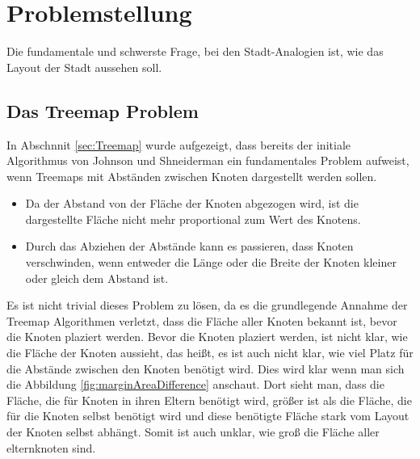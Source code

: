 \section{Problemstellung} \label{sec:Problemstellung}
Die fundamentale und schwerste Frage, bei den Stadt-Analogien ist, wie das Layout der Stadt aussehen soll.

\subsection{Das Treemap Problem} \label{sec:TreemapProblem}
In Abschnnit \ref{sec:Treemap} wurde aufgezeigt, dass bereits der initiale Algorithmus von Johnson und Shneiderman \cite{johnson1991tree} ein fundamentales Problem aufweist, wenn Treemaps mit Abständen zwischen Knoten dargestellt werden sollen. 
\begin{itemize}
    \item Da der Abstand von der Fläche der Knoten abgezogen wird, ist die dargestellte Fläche nicht mehr proportional zum Wert des Knotens.
    \item Durch das Abziehen der Abstände kann es passieren, dass Knoten verschwinden, wenn entweder die Länge oder die Breite der Knoten kleiner oder gleich dem Abstand ist.
\end{itemize}

Es ist nicht trivial dieses Problem zu lösen, da es die grundlegende Annahme der Treemap Algorithmen verletzt, dass die Fläche aller Knoten bekannt ist, bevor die Knoten plaziert werden. 
Bevor die Knoten plaziert werden, ist nicht klar, wie die Fläche der Knoten aussieht, das heißt, es ist auch nicht klar, wie viel Platz für die Abstände zwischen den Knoten benötigt wird. Dies wird klar wenn man sich die Abbildung \ref{fig:marginAreaDifference} anschaut. Dort sieht man, dass die Fläche, die für Knoten in ihren Eltern benötigt wird, größer ist als die Fläche, die für die Knoten selbst benötigt wird und diese benötigte Fläche stark vom Layout der Knoten selbst abhängt. Somit ist auch unklar, wie groß die Fläche aller elternknoten sind. 

